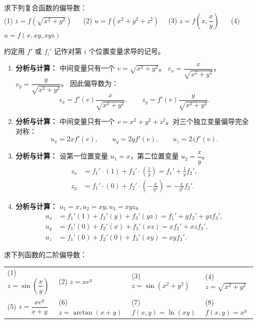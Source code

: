 \documentclass[lang=cn,11pt]{elegantbook}
\begin{document}
\begin{exercise}[抽象复合函数求导]
求下列复合函数的偏导数：\\
(1) $z = f(\sqrt{x^2+y^2})$ ~~ (2) $u = f(x^2+y^2+z^2)$ ~~(3) $z = f\left(x,\dfrac{x}{y}\right)$ ~~ (4) $u = f(x,xy,xyz)$
\end{exercise}

\begin{solution}
约定用 $f'$ 或 $f_i'$ 记作对第 $i$ 个位置变量求导的记号。
\begin{enumerate}
  \item[(1)] \textbf{分析与计算：} 中间变量只有一个 $v = \sqrt{x^2+y^2}$。
  $v_x = \dfrac{x}{\sqrt{x^2+y^2}}$，$v_y = \dfrac{y}{\sqrt{x^2+y^2}}$。
  因此偏导数为：
  \[
  z_x = f'(v) \frac{x}{\sqrt{x^2+y^2}}, \qquad z_y = f'(v) \frac{y}{\sqrt{x^2+y^2}}.
  \]

  \item[(2)] \textbf{分析与计算：} 中间变量只有一个 $v = x^2+y^2+z^2$。对三个独立变量偏导完全对称：
  \[
  u_x = 2x f'(v), \qquad u_y = 2y f'(v), \qquad u_z = 2z f'(v).
  \]

  \item[(3)] \textbf{分析与计算：} 设第一位置变量 $u_1=x$，第二位置变量 $u_2=\dfrac{x}{y}$。
  \begin{align*}
  z_x &= f_1'\cdot(1) + f_2'\cdot\left(\frac{1}{y}\right) = f_1' + \frac{1}{y}f_2', \\
  z_y &= f_1'\cdot(0) + f_2'\cdot\left(-\frac{x}{y^2}\right) = -\frac{x}{y^2}f_2'.
  \end{align*}

  \item[(4)] \textbf{分析与计算：} $u_1=x, u_2=xy, u_3=xyz$。
  \begin{align*}
  u_x &= f_1'(1) + f_2'(y) + f_3'(yz) = f_1' + yf_2' + yzf_3', \\
  u_y &= f_1'(0) + f_2'(x) + f_3'(xz) = xf_2' + xzf_3', \\
  u_z &= f_1'(0) + f_2'(0) + f_3'(xy) = xyf_3'.
  \end{align*}
\end{enumerate}
\end{solution}

\begin{exercise}[求具体函数的二阶偏导数]
求下列函数的二阶偏导数：\\
\begin{tabular}{p{} p{} p{} p{}}
(1) $z = \sin\left(\dfrac{x}{y}\right)$ & (2) $z = xe^y$ & (3) $z = \sin(x^2+y^2)$ & (4) $z = \sqrt{x^2+y^2}$ \\
(5) $z = \dfrac{xe^y}{x+y}$ & (6) $z = \arctan(x+y)$ & (7) $f(x,y) = \ln(xy)$ & (8) $f(x,y) = x^y$
\end{tabular}
\end{exercise}
\end{document}

